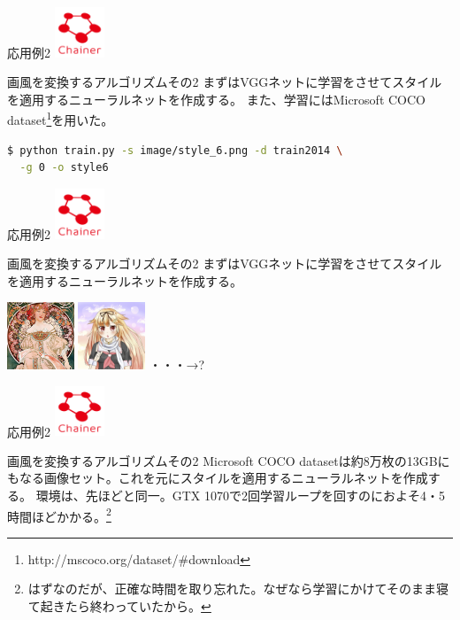 \documentclass[12pt, unicode]{beamer}
\begin{document}
\newcommand\Small{\fontsize{9}{9.2}\selectfont}
\begin{frame}[fragile]{応用例2}
\includegraphics[clip,width=1.5cm]{image/chainer_logo.png}
\begin{block}{画風を変換するアルゴリズムその2}
まずはVGGネットに学習をさせてスタイルを適用するニューラルネットを作成する。
また、学習にはMicrosoft COCO dataset\footnote[frame]{http://mscoco.org/dataset/\#download}を用いた。
\end{block}
\begin{lstlisting}[language=bash,basicstyle=\ttfamily\Small,caption={train with style image and dataset}]
$ python train.py -s image/style_6.png -d train2014 \
  -g 0 -o style6
\end{lstlisting}
\end{frame}

\begin{frame}[fragile]{応用例2}
\includegraphics[clip,width=1.5cm]{image/chainer_logo.png}
\begin{block}{画風を変換するアルゴリズムその2}
まずはVGGネットに学習をさせてスタイルを適用するニューラルネットを作成する。
\end{block}
\includegraphics[clip,width=2.0cm]{image/style_6.png}
\includegraphics[clip,width=2.0cm]{image/yuudachi_400x400.png}
・・・→\Large{?}
\end{frame}

\begin{frame}[fragile]{応用例2}
\includegraphics[clip,width=1.5cm]{image/chainer_logo.png}
\begin{block}{画風を変換するアルゴリズムその2}
Microsoft COCO datasetは約8万枚の13GBにもなる画像セット。これを元にスタイルを適用するニューラルネットを作成する。
環境は、先ほどと同一。GTX 1070で2回学習ループを回すのにおよそ4・5時間ほどかかる。\footnote[frame]{はずなのだが、正確な時間を取り忘れた。なぜなら学習にかけてそのまま寝て起きたら終わっていたから。}
\end{block}
\end{frame}
\end{document}
